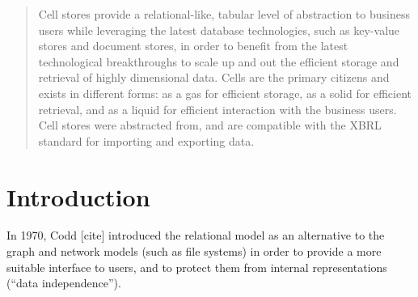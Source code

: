 \documentclass{vldb}
\begin{document}
\author{
%
%
\alignauthor
Ghislain Fourny\\
       \\
       \\
}
\date{8 September 2014}


\maketitle

\begin{abstract}
Cell stores provide a relational-like, tabular level of abstraction to business users while leveraging the latest database technologies, such as key-value stores and document stores, in order to benefit from the latest technological breakthroughs to scale up and out the efficient storage and retrieval of highly dimensional data. Cells are the primary citizens and exists in different forms: as a gas for efficient storage, as a solid for efficient retrieval, and as a liquid for efficient interaction with the business users. Cell stores were abstracted from, and are compatible with the XBRL standard for importing and exporting data.
\end{abstract}


\section{Introduction}
In 1970, Codd [cite] introduced the relational model as an alternative to the graph and network models (such as file systems) in order to provide a more suitable interface to users, and to protect them from internal representations (``data independence'').
\end{document}
